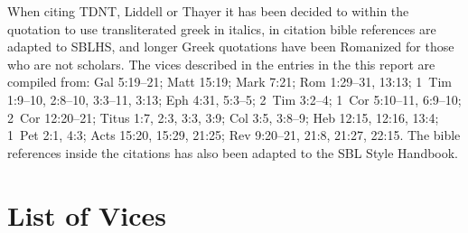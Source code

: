 \documentclass[a4paper,twocolumn,twoside,notitlepage,10pt]{article}
\begin{document}
When citing TDNT, Liddell or Thayer it has been decided to within the quotation to use transliterated greek in italics, in citation bible references are adapted to SBLHS, and longer Greek quotations have been Romanized for those who are not scholars. The vices described in the entries in the this report are compiled from: Gal 5:19--21; Matt 15:19; Mark 7:21; Rom 1:29--31, 13:13; 1~Tim 1:9--10, 2:8--10, 3:3--11, 3:13; Eph 4:31, 5:3--5; 2~Tim 3:2--4; 1~Cor 5:10--11, 6:9--10; 2~Cor 12:20--21; Titus 1:7, 2:3, 3:3, 3:9; Col 3:5, 3:8--9; Heb 12:15, 12:16, 13:4; 1~Pet 2:1, 4:3; Acts 15:20, 15:29, 21:25; Rev 9:20--21, 21:8, 21:27, 22:15.
The bible references inside the citations has also been adapted to the SBL Style Handbook.

\section{List of Vices}
\end{document}
